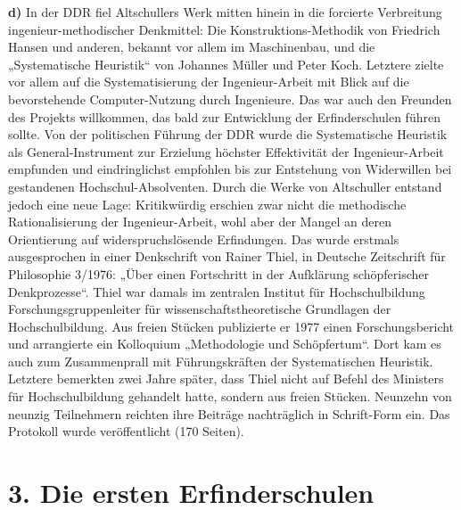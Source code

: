 \documentclass[11pt,a4paper]{article}
\begin{document}
\textbf{d)} 
In der DDR fiel Altschullers Werk mitten hinein in die forcierte Verbreitung
ingenieur-methodischer Denkmittel: Die Konstruktions-Methodik von Friedrich
Hansen und anderen, bekannt vor allem im Maschinenbau, und die „Systematische
Heuristik“ von Johannes Müller und Peter Koch. Letztere zielte vor allem auf
die Systematisierung der Ingenieur-Arbeit mit Blick auf die bevorstehende
Computer-Nutzung durch Ingenieure. Das war auch den Freunden des Projekts
willkommen, das bald zur Entwicklung der Erfinderschulen führen sollte. Von der
politischen Führung der DDR wurde die Systematische Heuristik als
General-Instrument zur Erzielung höchster Effektivität der Ingenieur-Arbeit
empfunden und eindringlichst empfohlen bis zur Entstehung von Widerwillen bei
gestandenen Hochschul-Absolventen. Durch die Werke von Altschuller entstand
jedoch eine neue Lage: Kritikwürdig erschien zwar nicht die methodische
Rationalisierung der Ingenieur-Arbeit, wohl aber der Mangel an deren
Orientierung auf widerspruchslösende Erfindungen. Das wurde erstmals
ausgesprochen in einer Denkschrift von Rainer Thiel, in Deutsche Zeitschrift
für Philosophie 3/1976: „Über einen Fortschritt in der Aufklärung
schöpferischer Denkprozesse“. Thiel war damals im zentralen Institut für
Hochschulbildung Forschungsgruppenleiter für wissenschaftstheoretische
Grundlagen der Hochschulbildung. Aus freien Stücken publizierte er 1977 einen
Forschungsbericht und arrangierte ein Kolloquium „Methodologie und
Schöpfertum“. Dort kam es auch zum Zusammenprall mit Führungskräften der
Systematischen Heuristik.  Letztere bemerkten zwei Jahre später, dass Thiel
nicht auf Befehl des Ministers für Hochschulbildung gehandelt hatte, sondern
aus freien Stücken. Neunzehn von neunzig Teilnehmern reichten ihre Beiträge
nachträglich in Schrift-Form ein. Das Protokoll wurde veröffentlicht (170
Seiten).

\section*{3. Die ersten Erfinderschulen}
\end{document}
